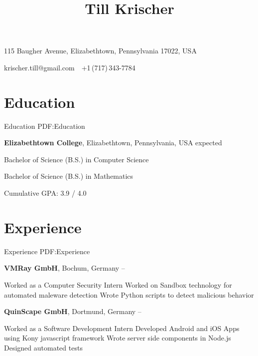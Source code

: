 \documentclass[letterpaper,MMMyyyy,nonstop]{simpleresumecv}
\newcommand{\CVAuthor}{Till Krischer}
\begin{document}

\title{\CVAuthor}

\bigskip

\begin{subtitle}
115 Baugher Avenue, Elizabethtown, Pennsylvania 17022, USA
\par
krischer.till@gmail.com
\,\SubBulletSymbol\,
+1\,(717)\,343-7784
\end{subtitle}

\bigskip

\begin{body}


\section
{Education}
{Education}
{PDF:Education}


\textbf{Elizabethtown College},
Elizabethtown, Pennsylvania, USA
\hfill
expected 

\Gap
\BulletItem
Bachelor of Science (B.S.) in Computer Science

\Gap
\BulletItem
Bachelor of Science (B.S.) in Mathematics

\Gap
\BulletItem
Cumulative GPA: 3.9 / 4.0

\bigskip


\section
{Experience}
{Experience}
{PDF:Experience}

\textbf{VMRay GmbH},
Bochum, Germany
\hfill
{} --

\Gap
\BulletItem
Worked as a Computer Security Intern
\BulletItem
Worked on Sandbox technology for automated maleware detection
\BulletItem
Wrote Python scripts to detect malicious behavior

\bigskip

\textbf{QuinScape GmbH},
Dortmund, Germany
\hfill
{} --

\Gap
\BulletItem
Worked as a Software Development Intern
\BulletItem
Developed Android and iOS Apps using Kony javascript framework
\BulletItem
Wrote server side components in Node.js
\BulletItem
Designed automated tests


\end{body}
\end{document}

